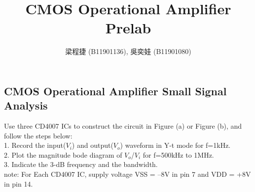 \documentclass{article}
\title{CMOS Operational Amplifier Prelab}
\author{梁程捷 (B11901136), 吳奕娃 (B11901080)}
\date{}
\begin{document}
\begin{CJK*}{UTF8}{bkai}

\maketitle

\section*{CMOS Operational Amplifier Small Signal Analysis}
Use three CD4007 ICs to construct the circuit in Figure (a) or Figure (b), and follow the steps below: \\
1. Record the input($V_i$) and output($V_o$) waveform in Y-t mode for f=1\unit{\kilo\hertz}. \\
2. Plot the magnitude bode diagram of $V_o$/$V_i$ for f=500\unit{\kilo\hertz} to 1\unit{\mega\hertz}. \\
3. Indicate the 3-dB frequency and the bandwidth. \\
note: For Each CD4007 IC, supply voltage VSS = –8V in pin 7 and VDD = +8V in pin 14. \\

\begin{figure}[h]
    \begin{center}
    

\end{center}
\end{figure}
\end{CJK*}
\end{document}
